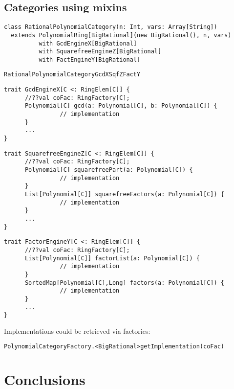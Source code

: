 \documentclass{llncs}
\begin{document}
\subsection{Categories using mixins} %


\begin{verbatim}
class RationalPolynomialCategory(n: Int, vars: Array[String])
  extends PolynomialRing[BigRational](new BigRational(), n, vars)
          with GcdEngineX[BigRational] 
          with SquarefreeEngineZ[BigRational]
          with FactEngineY[BigRational]
\end{verbatim}

\begin{verbatim}
RationalPolynomialCategoryGcdXSqfZFactY
\end{verbatim}

\begin{verbatim}
trait GcdEngineX[C <: RingElem[C]] {
      //??val coFac: RingFactory[C];
      Polynomial[C] gcd(a: Polynomial[C], b: Polynomial[C]) {
                // implementation 
      }
      ...
}
\end{verbatim}

\begin{verbatim}
trait SquarefreeEngineZ[C <: RingElem[C]] {
      //??val coFac: RingFactory[C];
      Polynomial[C] squarefreePart(a: Polynomial[C]) {
                // implementation 
      }
      List[Polynomial[C]] squarefreeFactors(a: Polynomial[C]) {
                // implementation 
      }
      ...
}
\end{verbatim}

\begin{verbatim}
trait FactorEngineY[C <: RingElem[C]] {
      //??val coFac: RingFactory[C];
      List[Polynomial[C]] factorList(a: Polynomial[C]) {
                // implementation 
      }
      SortedMap[Polynomial[C],Long] factors(a: Polynomial[C]) {
                // implementation 
      }
      ...
}
\end{verbatim}


Implementations could be retrieved via factories:
\begin{verbatim}
PolynomialCategoryFactory.<BigRational>getImplementation(coFac)
\end{verbatim}



\section{Conclusions} %
\end{document}
